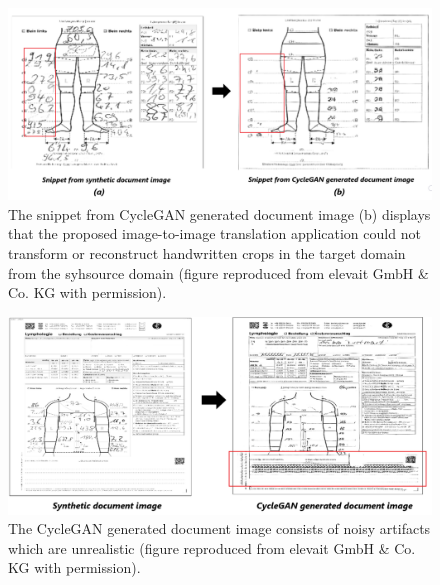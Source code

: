 \begin{figure}[H]
        \begin{center}
	    \includegraphics[scale=0.28]{images/Evaluation/failure1.png}
	    \caption[The snippet from \ac{CycleGAN} generated document image displays that the proposed image-to-image translation application could not transform or reconstruct handwritten crops in the target domain from the source domain.]{The snippet from \ac{CycleGAN} generated document image (b) displays that the proposed image-to-image translation application could not transform or reconstruct handwritten crops in the target domain from the syhsource domain (figure reproduced from elevait GmbH \& Co. KG with permission).}
	    \label{fig:failure1}
	    \end{center}
\end{figure}


\begin{figure}[H]
        \begin{center}
	    \includegraphics[scale=0.50]{images/Evaluation/failure2.png}
	    \caption[The \ac{CycleGAN} generated document image consists of noisy artifacts which are unrealistic.]{The \ac{CycleGAN} generated document image consists of noisy artifacts which are unrealistic (figure reproduced from elevait GmbH \& Co. KG with permission).}
	    \label{fig:failure2}
	    \end{center}
\end{figure}


